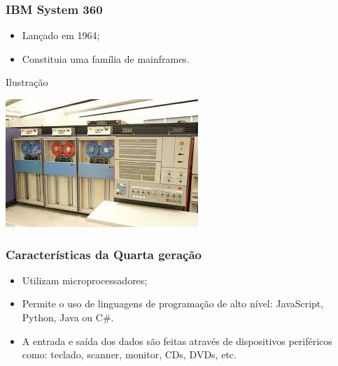 \documentclass[aspectratio=169]{beamer} %
\begin{document}
\begin{frame}
	\frametitle{IBM System 360}
	
	\begin{itemize}
		\item Lançado em 1964; 
		\item Constituia uma família de mainframes.
	\end{itemize}\vfill
	
	\begin{exampleblock}{Ilustra\c cão}
		\begin{center}
			\includegraphics[scale=0.5]{img/ibm360}
		\end{center}
	\end{exampleblock}
\end{frame}

\begin{frame}
	\frametitle{Características da Quarta gera\c cão}
	
	\begin{itemize}
		\item Utilizam microprocessadores;
		\item Permite o uso de linguagens de programação de alto nível: JavaScript, Python, Java ou C$\#$.
		\item A entrada e saída dos dados são feitas através de dispositivos periféricos como: teclado, scanner, monitor, CDs, DVDs, etc.
	\end{itemize}
\end{frame}
\end{document}
